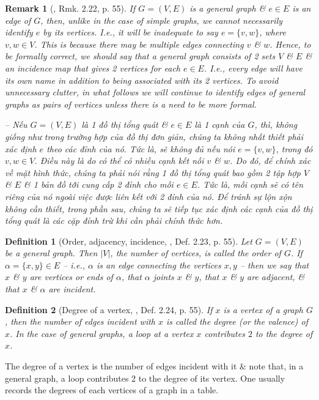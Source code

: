 \documentclass[oneside]{book}
\newtheorem{definition}{Definition}
\newtheorem{remark}{Remark}
\begin{document}
\begin{remark}[\cite{Shahriari2022}, Rmk. 2.22, p. 55]
	If $G = (V,E)$ is a general graph \& $e\in E$ is an edge of $G$, then, unlike in the case of simple graphs, we cannot necessarily identify $e$ by its vertices. I.e., it will be inadequate to say $e = \{v,w\}$, where $v,w\in V$. This is because there may be multiple edges connecting $v$ \& $w$. Hence, to be formally correct, we should say that a general graph consists of 2 sets $V$ \& $E$ \& an incidence map that gives 2 vertices for each $e\in E$. I.e., every edge will have its own name in addition to being associated with its 2 vertices. To avoid unnecessary clutter, in what follows we will continue to identify edges of general graphs as pairs of vertices unless there is a need to be more formal.
	
	-- Nếu $G = (V,E)$ là 1 đồ thị tổng quát \& $e\in E$ là 1 cạnh của $G$, thì, không giống như trong trường hợp của đồ thị đơn giản, chúng ta không nhất thiết phải xác định $e$ theo các đỉnh của nó. Tức là, sẽ không đủ nếu nói $e = \{v,w\}$, trong đó $v,w\in V$. Điều này là do có thể có nhiều cạnh kết nối $v$ \& $w$. Do đó, để chính xác về mặt hình thức, chúng ta phải nói rằng 1 đồ thị tổng quát bao gồm 2 tập hợp $V$ \& $E$ \& 1 bản đồ tới cung cấp 2 đỉnh cho mỗi $e\in E$. Tức là, mỗi cạnh sẽ có tên riêng của nó ngoài việc được liên kết với 2 đỉnh của nó. Để tránh sự lộn xộn không cần thiết, trong phần sau, chúng ta sẽ tiếp tục xác định các cạnh của đồ thị tổng quát là các cặp đỉnh trừ khi cần phải chính thức hơn.
\end{remark}

\begin{definition}[Order, adjacency, incidence, \cite{Shahriari2022}, Def. 2.23, p. 55]
	Let $G = (V,E)$ be a general graph. Then $|V|$, the number of vertices, is called the {\rm order} of $G$. If $\alpha = \{x,y\}\in E$ -- i.e., $\alpha$ is an edge connecting the vertices $x,y$ -- then we say that $x$ \& $y$ are {\rm vertices} or {\rm ends} of $\alpha$, that $\alpha$ {\rm joints} $x$ \& $y$, that $x$ \& $y$ are {\rm adjacent}, \& that $x$ \& $\alpha$ are {\rm incident}.
\end{definition}

\begin{definition}[Degree of a vertex, \cite{Shahriari2022}, Def. 2.24, p. 55]
	If $x$ is a vertex of a graph $G$, then the number of edges incident with $x$ is called the {\rm degree} (or the {\rm valence}) of $x$. In the case of general graphs, a loop at a vertex $x$ contributes $2$ to the degree of $x$.
\end{definition}
The degree of a vertex is the number of edges incident with it \& note that, in a general graph, a loop contributes 2 to the degree of its vertex. One usually records the degrees of each vertices of a graph in a table.
\end{document}
